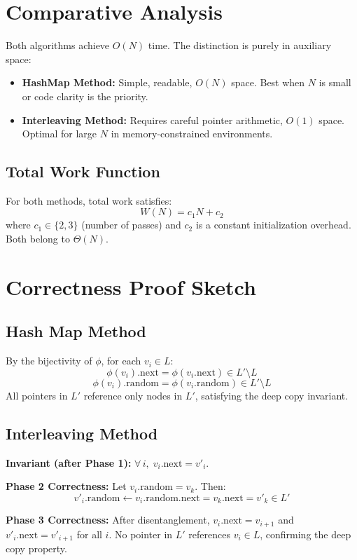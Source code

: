 \documentclass[10pt,journal,compsoc]{IEEEtran}
\begin{document}
\section{Comparative Analysis}

Both algorithms achieve $O(N)$ time. The distinction is purely in auxiliary space:
\begin{itemize}
    \item \textbf{HashMap Method:} Simple, readable, $O(N)$ space. Best when $N$ is small or code clarity is the priority.
    \item \textbf{Interleaving Method:} Requires careful pointer arithmetic, $O(1)$ space. Optimal for large $N$ in memory-constrained environments.
\end{itemize}

\subsection{Total Work Function}

For both methods, total work satisfies:
\[
W(N) = c_1 N + c_2
\]
where $c_1 \in \{2, 3\}$ (number of passes) and $c_2$ is a constant initialization overhead. Both belong to $\Theta(N)$.

\section{Correctness Proof Sketch}
\subsection{Hash Map Method}

By the bijectivity of $\phi$, for each $v_i \in L$:
\[
\phi(v_i).\text{next} = \phi(v_i.\text{next}) \in L' \setminus L
\]
\[
\phi(v_i).\text{random} = \phi(v_i.\text{random}) \in L' \setminus L
\]
All pointers in $L'$ reference only nodes in $L'$, satisfying the deep copy invariant.

\subsection{Interleaving Method}

\textbf{Invariant (after Phase 1):} $\forall\, i,\; v_i.\text{next} = v'_i$.

\textbf{Phase 2 Correctness:} Let $v_i.\text{random} = v_k$. Then:
\[
v'_i.\text{random} \leftarrow v_i.\text{random}.\text{next} = v_k.\text{next} = v'_k \in L'
\]

\textbf{Phase 3 Correctness:} After disentanglement, $v_i.\text{next} = v_{i+1}$ and $v'_i.\text{next} = v'_{i+1}$ for all $i$. No pointer in $L'$ references $v_i \in L$, confirming the deep copy property.
\end{document}
